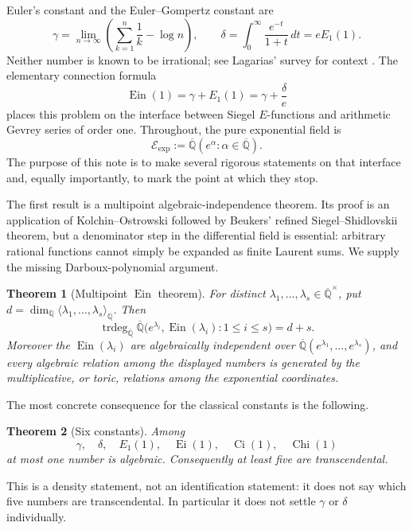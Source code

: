 \documentclass[11pt]{article}
\newtheorem{theorem}{Theorem}[section]
\theoremstyle{definition}
\theoremstyle{remark}
\newcommand{\Q}{\mathbb Q}
\newcommand{\Qb}{\overline{\mathbb Q}}
\newcommand{\Qbar}{\overline{\mathbb Q}}
\newcommand{\trdeg}{\operatorname{trdeg}}
\newcommand{\Ein}{\operatorname{Ein}}
\newcommand{\Ei}{\operatorname{Ei}}
\newcommand{\Ci}{\operatorname{Ci}}
\newcommand{\Chi}{\operatorname{Chi}}
\newcommand{\Eexp}{\mathcal E_{\mathrm{exp}}}
\begin{document}
Euler's constant and the Euler--Gompertz constant are
\[
 \gamma=\lim_{n\to\infty}\left(\sum_{k=1}^n\frac1k-\log n\right),
 \qquad
 \delta=\int_0^\infty\frac{e^{-t}}{1+t}\,dt=eE_1(1).
\]
Neither number is known to be irrational; see Lagarias' survey for context
\cite{Lagarias2013}.  The elementary connection formula
\begin{equation}\label{eq:hardy-connection}
 \Ein(1)=\gamma+E_1(1)=\gamma+\frac{\delta}{e}
\end{equation}
places this problem on the interface between Siegel \(E\)-functions and
arithmetic Gevrey series of order one.  Throughout, the pure exponential
field is
\[
 \Eexp:=\Qbar(e^\alpha:\alpha\in\Qbar).
\]
The purpose of this note is to make
several rigorous statements on that interface and, equally importantly, to
mark the point at which they stop.

The first result is a multipoint algebraic-independence theorem.  Its proof is
an application of Kolchin--Ostrowski followed by Beukers' refined
Siegel--Shidlovskii theorem, but a denominator step in the differential field
is essential: arbitrary rational functions cannot simply be expanded as
finite Laurent sums.  We supply the missing Darboux-polynomial argument.

\begin{theorem}[Multipoint \(\Ein\) theorem]\label{thm:master-intro}
For distinct \(\lambda_1,\ldots,\lambda_s\in\Qb^\times\), put
\(d=\dim_\Q\langle\lambda_1,\ldots,\lambda_s\rangle_\Q\).  Then
\[
 \trdeg_{\Qb}\Qb\bigl(e^{\lambda_i},\Ein(\lambda_i):1\le i\le s\bigr)=d+s.
\]
Moreover the \(\Ein(\lambda_i)\) are algebraically independent over
\(\Qb(e^{\lambda_1},\ldots,e^{\lambda_s})\), and every algebraic relation
among the displayed numbers is generated by the multiplicative, or toric,
relations among the exponential coordinates.
\end{theorem}

The most concrete consequence for the classical constants is the following.

\begin{theorem}[Six constants]\label{thm:six-intro}
Among
\[
 \gamma,\quad \delta,\quad E_1(1),\quad \Ei(1),\quad \Ci(1),\quad \Chi(1)
\]
at most one number is algebraic.  Consequently at least five are
transcendental.
\end{theorem}

This is a density statement, not an identification statement: it does not say
which five numbers are transcendental.  In particular it does not settle
\(\gamma\) or \(\delta\) individually.
\end{document}
